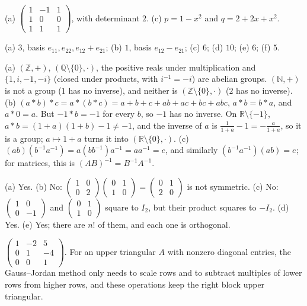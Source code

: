 \documentclass[11pt]{article}
\begin{document}
\begin{description}[leftmargin=0pt, itemsep=0.3em]
    \item[\ref{pr:interpolation}.] (a) $\begin{pmatrix} 1 & -1 & 1 \\ 1 & 0 & 0 \\ 1 & 1 & 1 \end{pmatrix}$, with determinant $2$. (c) $p = 1 - x^2$ and $q = 2 + 2x + x^2$.
    \item[\ref{pr:dims-special}.] (a) $3$, basis $e_{11}, e_{22}, e_{12} + e_{21}$; (b) $1$, basis $e_{12} - e_{21}$; (c) $6$; (d) $10$; (e) $6$; (f) $5$.
    \item[\ref{pr:abstract-groups}.] (a) $(\mathbb{Z}, +)$, $(\mathbb{Q} \setminus \{0\}, \cdot)$, the positive reals under multiplication and $\{1, i, -1, -i\}$ (closed under products, with $i^{-1} = -i$) are abelian groups. $(\mathbb{N}, +)$ is not a group ($1$ has no inverse), and neither is $(\mathbb{Z} \setminus \{0\}, \cdot)$ ($2$ has no inverse). (b) $(a \ast b) \ast c = a \ast (b \ast c) = a + b + c + ab + ac + bc + abc$, $a \ast b = b \ast a$, and $a \ast 0 = a$. But $-1 \ast b = -1$ for every $b$, so $-1$ has no inverse. On $\mathbb{R} \setminus \{-1\}$, $a \ast b = (1 + a)(1 + b) - 1 \neq -1$, and the inverse of $a$ is $\frac{1}{1 + a} - 1 = -\frac{a}{1 + a}$, so it is a group; $a \mapsto 1 + a$ turns it into $(\mathbb{R} \setminus \{0\}, \cdot)$. (c) $(ab)(b^{-1}a^{-1}) = a(bb^{-1})a^{-1} = aa^{-1} = e$, and similarly $(b^{-1}a^{-1})(ab) = e$; for matrices, this is $(AB)^{-1} = B^{-1}A^{-1}$.
    \item[\ref{pr:groups}.] (a) Yes. (b) No: $\begin{pmatrix} 1 & 0 \\ 0 & 2 \end{pmatrix}\begin{pmatrix} 0 & 1 \\ 1 & 0 \end{pmatrix} = \begin{pmatrix} 0 & 1 \\ 2 & 0 \end{pmatrix}$ is not symmetric. (c) No: $\begin{pmatrix} 1 & 0 \\ 0 & -1 \end{pmatrix}$ and $\begin{pmatrix} 0 & 1 \\ 1 & 0 \end{pmatrix}$ square to $I_2$, but their product squares to $-I_2$. (d) Yes. (e) Yes; there are $n!$ of them, and each one is orthogonal.
    \item[\ref{pr:inverse-triangular}.] $\begin{pmatrix} 1 & -2 & 5 \\ 0 & 1 & -4 \\ 0 & 0 & 1 \end{pmatrix}$. For an upper triangular $A$ with nonzero diagonal entries, the Gauss--Jordan method only needs to scale rows and to subtract multiples of lower rows from higher rows, and these operations keep the right block upper triangular.

\end{description}
\end{document}
